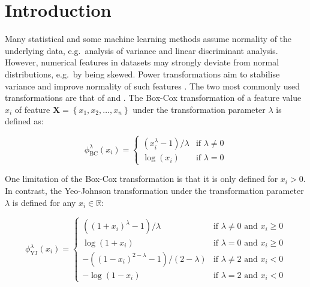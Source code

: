 \documentclass[preprint,12pt,authoryear]{elsarticle}
\begin{document}

\section{Introduction}\label{introduction}

Many statistical and some machine learning methods assume normality of
the underlying data, e.g.~analysis of variance and linear discriminant
analysis. However, numerical features in datasets may strongly deviate
from normal distributions, e.g.~by being skewed. Power transformations
aim to stabilise variance and improve normality of such features
\citep{Bartlett1947-rx, Tukey1957-rt}. The two most commonly used
transformations are that of \citet{Box1964-mz} and \citet{Yeo2000-vw}.
The Box-Cox transformation of a feature value \(x_i\) of feature
\(\mathbf{X}=\left\{x_1, x_2, \ldots, x_n \right\}\) under the
transformation parameter \(\lambda\) is defined as:

\begin{equation}
\label{eqn:box-cox-original}
\phi_{\text{BC}}^\lambda (x_i) = 
\begin{cases}
\left(x_i^\lambda - 1 \right) / \lambda & \text{if } \lambda \neq 0\\
\log(x_i) & \text{if } \lambda = 0
\end{cases}
\end{equation}

One limitation of the Box-Cox transformation is that it is only defined
for \(x_i > 0\). In contrast, the Yeo-Johnson transformation under the
transformation parameter \(\lambda\) is defined for any
\(x_i \in \mathbb{R}\):

\begin{equation}
\label{eqn:yeo-johnson-original}
\phi_{\text{YJ}}^\lambda (x_i) = 
\begin{cases}
\left( \left( 1 + x_i \right)^\lambda - 1\right) / \lambda & \text{if } \lambda \neq 0 \text{ and } x_i \geq 0\\
\log(1 + x_i) & \text{if } \lambda = 0 \text{ and } x_i \geq 0\\
-\left( \left( 1 - x_i\right)^{2 - \lambda} - 1 \right) / \left(2 - \lambda \right) & \text{if } \lambda \neq 2 \text{ and } x_i < 0\\
-\log(1 - x_i) & \text{if } \lambda = 2 \text{ and } x_i < 0
\end{cases}
\end{equation}
\end{document}
